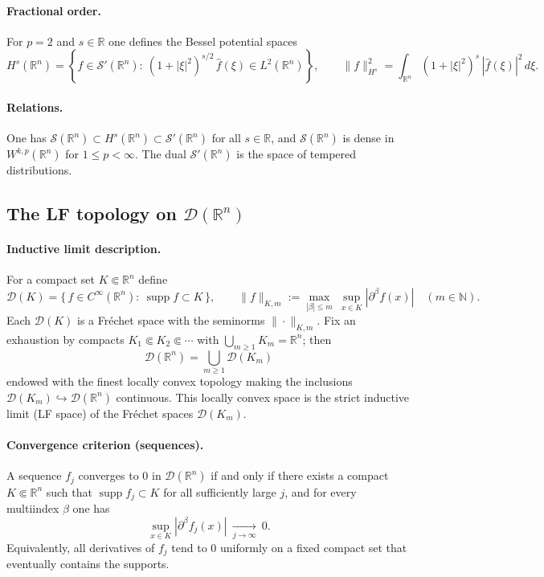 \documentclass[12pt,a4paper]{article}
\theoremstyle{plain}
\theoremstyle{definition}
\theoremstyle{remark}
\theoremstyle{remark}
\begin{document}
\paragraph{Fractional order.}
For $p=2$ and $s\in\mathbb{R}$ one defines the Bessel potential spaces
\[
H^s(\mathbb{R}^n)=\left\{f\in\mathcal{S}'(\mathbb{R}^n):\ (1+|\xi|^2)^{s/2}\,\widehat{f}(\xi)\in L^2(\mathbb{R}^n)\right\},
\qquad
\|f\|_{H^s}^2=\int_{\mathbb{R}^n}(1+|\xi|^2)^s\,|\widehat{f}(\xi)|^2\,d\xi.
\]

\paragraph{Relations.}
One has $\mathcal{S}(\mathbb{R}^n)\subset H^s(\mathbb{R}^n)\subset \mathcal{S}'(\mathbb{R}^n)$ for all $s\in\mathbb{R}$,
and $\mathcal{S}(\mathbb{R}^n)$ is dense in $W^{k,p}(\mathbb{R}^n)$ for $1\le p<\infty$.
The dual $\mathcal{S}'(\mathbb{R}^n)$ is the space of tempered distributions.

\subsection*{The LF topology on $\mathcal{D}(\mathbb{R}^n)$}

\paragraph{Inductive limit description.}
For a compact set $K\Subset\mathbb{R}^n$ define
\[
\mathcal{D}(K)=\{\,f\in C^\infty(\mathbb{R}^n):\ \operatorname{supp}f\subset K\,\}, 
\qquad 
\|f\|_{K,m}:=\max_{|\beta|\le m}\ \sup_{x\in K}|\partial^\beta f(x)|\quad(m\in\mathbb N).
\]
Each $\mathcal{D}(K)$ is a Fr\'echet space with the seminorms $\|\cdot\|_{K,m}$. 
Fix an exhaustion by compacts $K_1\Subset K_2\Subset\cdots$ with $\bigcup_{m\ge1}K_m=\mathbb{R}^n$; then
\[
\mathcal{D}(\mathbb{R}^n)=\bigcup_{m\ge1}\mathcal{D}(K_m)
\]
endowed with the finest locally convex topology making the inclusions $\mathcal{D}(K_m)\hookrightarrow\mathcal{D}(\mathbb{R}^n)$ continuous.
This locally convex space is the strict inductive limit (LF space) of the Fr\'echet spaces $\mathcal{D}(K_m)$.

\paragraph{Convergence criterion (sequences).}
A sequence $f_j$ converges to $0$ in $\mathcal{D}(\mathbb{R}^n)$ if and only if there exists a compact $K\Subset\mathbb{R}^n$ such that $\operatorname{supp}f_j\subset K$ for all sufficiently large $j$, and for every multiindex $\beta$ one has
\[
\sup_{x\in K}|\partial^\beta f_j(x)|\ \xrightarrow[j\to\infty]{}\ 0.
\]
Equivalently, all derivatives of $f_j$ tend to $0$ uniformly on a fixed compact set that eventually contains the supports.
\end{document}
